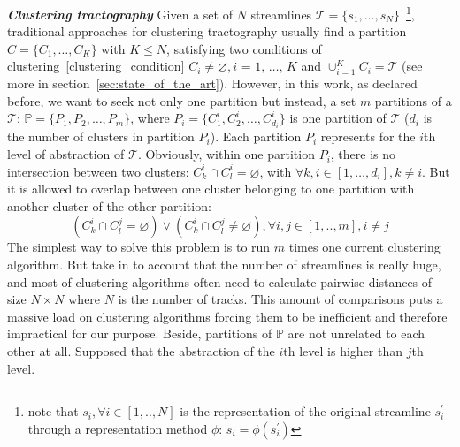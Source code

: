 \textbf{\textit{Clustering tractography}}
Given a set of $N$ streamlines $ \mathcal{T}  = \{s_1,\ldots,s_N\}$~\footnote{note that $s_i, \forall i \in [1, .., N]$ 
is the representation of the original streamline $s_{i}^{'}$ through a representation method $\phi$: $s_i = \phi(s_{i}^{'})$},
traditional approaches for clustering tractography usually find a partition $C = \{C_{1}, \ldots, C_{K}\}$ with $K \leq N$, satisfying two conditions of clustering~\ref{clustering_condition} $C_{i}\neq \varnothing, \textit{i = 1, \ldots, K}$ and $\cup_{i=1}^{\textit{K}}C_{i} = \mathcal{T}$ (see more in section~\ref{sec:state_of_the_art}). However, in this work, as declared before, we want to seek not only one partition but instead, a set $m$ partitions of a $\mathcal{T}$: $\mathbb{P} = \{P_{1}, P_{2}, \ldots, P_{m}\}$, where $P_{i} = \{C_{1}^{i}, C_{2}^{i}, \ldots, C_{d_{i}}^{i}\}$ is one partition of $\mathcal{T}$ ($d_{i}$ is the number of clusters in partition $P_{i}$). Each partition $P_i$ represents for the $i$th level of abstraction of $\mathcal{T}$. Obviously, within one partition $P_{i}$, there is no intersection between two clusters: $C_{k}^{i} \cap C_{l}^{i} = \varnothing$, with $\forall k,i \in [1,\ldots, d_{i}], k \neq i$. But it is allowed to overlap between one cluster belonging to one partition with another cluster of the other partition:
\begin{equation}
\label{eq:condition_clusters}
 (C_{k}^{i} \cap C_{l}^{j} = \varnothing) \vee (C_{k}^{i} \cap C_{l}^{j} \neq \varnothing), \forall i,j \in [1, .., m], i \neq j  
\end{equation}
The simplest way to solve this problem is to run $m$ times one current clustering algorithm. But take in to account that the number of streamlines is really huge, and most of clustering algorithms often need to calculate pairwise distances of size $N \times N$ where $N$ is the number of tracks. This amount of comparisons puts a massive load on clustering algorithms forcing them to be inefficient and therefore impractical for our purpose. 
Beside, partitions of $\mathbb{P}$ are not unrelated to each other at all. Supposed that the abstraction of the $i$th level is higher than $j$th level. 

